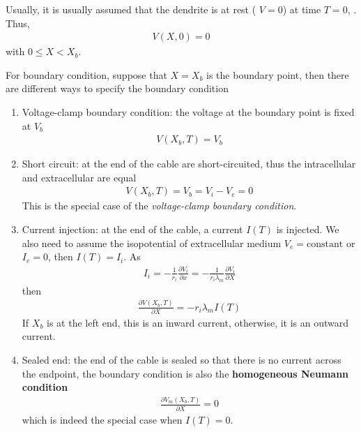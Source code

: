 Usually, it is usually assumed that the dendrite is at rest ( $V=0$)
at time $T=0$, . Thus,
\begin{eqnarray}
  \label{eq:440}
  V(X,0) = 0
\end{eqnarray}
with $0\le X < X_b$.

For boundary condition, suppose that $X=X_b$ is the boundary point,
then there are different ways to specify the boundary condition
\begin{enumerate}
\item Voltage-clamp boundary condition: the voltage at the boundary
  point is fixed at $V_b$
  \begin{eqnarray}
    \label{eq:441}
    V(X_b,T) = V_b
  \end{eqnarray}

\item Short circuit: at the end of the cable are short-circuited, thus
  the intracellular and extracellular are equal
  \begin{eqnarray}
    \label{eq:442}
    V(X_b,T) = V_b = V_i-V_e = 0
  \end{eqnarray}
  This is the special case of the
  {\it voltage-clamp boundary condition}.

\item Current injection: at the end of the cable, a current $I(T)$ is
  injected. We also need to assume the isopotential of extracellular
  medium $V_e=\text{constant}$ or $I_e=0$, then $I(T) = I_i$. As
  \begin{eqnarray}
    \label{eq:443}
    I_i = -\frac{1}{r_i}\frac{\partial V_i}{\partial x} =  
    -\frac{1}{r_i \lambda_m}\frac{\partial V_i}{\partial X}
  \end{eqnarray}
then
\begin{eqnarray}
  \label{eq:444}
  \frac{\partial V(X_b,T)}{\partial X} = -r_i \lambda_m I(T)
\end{eqnarray}
If $X_b$ is at the left end, this is an inward current, otherwise, it
is an outward current.

\item Sealed end: the end of the cable is sealed so that there is no
  current across the endpoint, the boundary condition is also the {\bf
    homogeneous Neumann condition}
  \begin{eqnarray}
    \label{eq:445}
    \frac{\partial V_m(X_b,T)}{\partial X} = 0
  \end{eqnarray}
which is indeed the special case when $I(T)=0$.
\end{enumerate}


